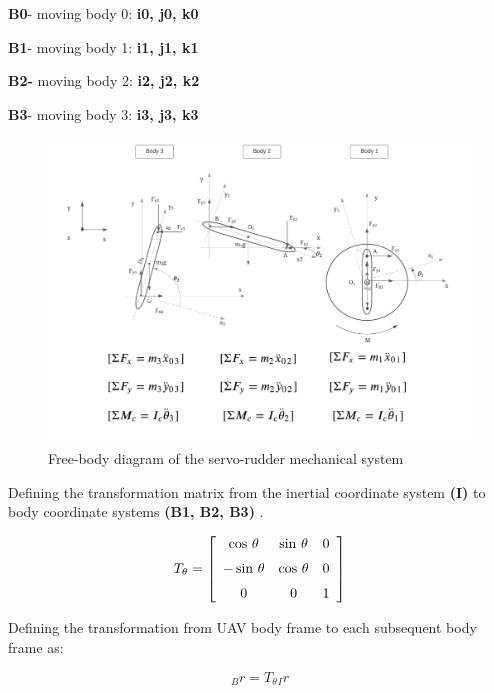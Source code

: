 \textbf{B0}- moving body 0:\textbf{ i0, j0, k0 }

\textbf{B1}- moving body 1:\textbf{ i1, j1, k1 }

\textbf{B2-} moving body 2: \textbf{i2, j2, k2}

\textbf{B3}- moving body 3:\textbf{ i3, j3, k3 }



\begin{figure}[h!]
  \includegraphics[scale=0.6]{graphics/Servo-Rudder2.png}
  \caption{Free-body diagram of the servo-rudder mechanical system}
  \label{fig:free-body diagram of the servo-rudder mechanical system}
\end{figure}


Defining the transformation matrix from the inertial coordinate system \textbf{(I)} to body coordinate systems \textbf{(B1, B2, B3) } \cite{santos2001dinamica}.

\begin{equation}\label{rotmat}
	T_{\theta} = \left[ \begin {array}{ccc} \cos\,\theta&\sin\,\theta&0
\\ \noalign{\medskip}-\sin\,\theta&\cos\,\theta&0
\\ \noalign{\medskip}0&0&1\end {array} \right]
\end{equation}

Defining the transformation from UAV body frame to each subsequent body frame as:

\begin{equation}\label{i_to_B}
_{B}{r} = T_{\theta}  {_I}{r}
\end{equation}

